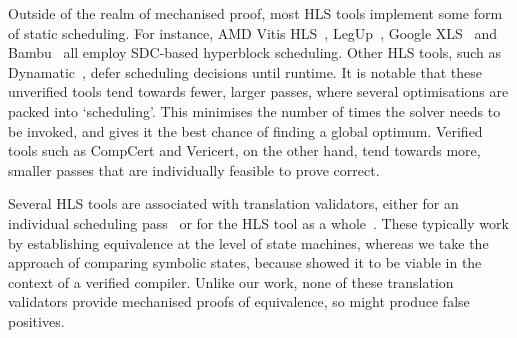Outside of the realm of mechanised proof, most HLS tools implement some form of
static scheduling. For instance, AMD Vitis HLS~\cite{amd23_vitis_forum},
LegUp~\cite[][p.60]{canis15_legup}, Google XLS~\cite[line~112]{google23_xls} and
Bambu~\cite[line~304]{ferrandi21_bambu} all employ SDC-based hyperblock
scheduling. Other HLS tools, such as
Dynamatic~\cite{josipović18_dynam_sched_high_synth}, defer scheduling decisions
until runtime. It is notable that these unverified tools tend towards fewer,
larger passes, where several optimisations are packed into `scheduling'. This
minimises the number of times the solver needs to be invoked, and gives it the
best chance of finding a global optimum. Verified tools such as CompCert and
Vericert, on the other hand, tend towards more, smaller passes that are
individually feasible to prove correct.

Several HLS tools are associated with translation validators, either for an
individual scheduling
pass~\cite{chouksey20_verif_sched_condit_behav_high_level_synth,
  karfa06_formal_verif_method_sched_high_synth, kim04_autom_fsmd} or for the HLS
tool as a whole~\cite{mentor20_catap_high_level_synth, tiemeyer19_crest}. These
typically work by establishing equivalence at the level of state machines,
whereas we take the approach of comparing symbolic states, because
\textcite{tristan08_formal_verif_trans_valid} showed it to be viable in the
context of a verified compiler. Unlike our work, none of these translation
validators provide mechanised proofs of equivalence, so might produce false
positives.






